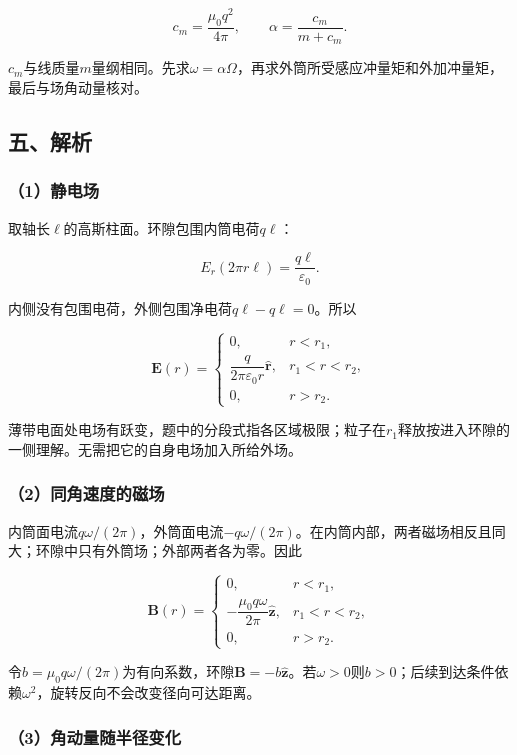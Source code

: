 \documentclass[12pt,a4paper,fontset=fandol]{ctexart}
\begin{document}
\[
c_m=\frac{\mu_0q^2}{4\pi},
\qquad \alpha=\frac{c_m}{m+c_m}.
\]

\(c_m\)与线质量\(m\)量纲相同。先求\(\omega=\alpha\Omega\)，再求外筒所受感应冲量矩和外加冲量矩，最后与场角动量核对。

\subsection{五、解析}\label{ux4e94ux89e3ux6790-5}

\subsubsection{（1）静电场}\label{ux9759ux7535ux573a}

取轴长\(\ell\)的高斯柱面。环隙包围内筒电荷\(q\ell\)：

\[
E_r(2\pi r\ell)=\frac{q\ell}{\varepsilon_0}.
\]

内侧没有包围电荷，外侧包围净电荷\(q\ell-q\ell=0\)。所以

\[
\boxed{
\boldsymbol E(r)=
\begin{cases}
0,&r<r_1,\\
\dfrac{q}{2\pi\varepsilon_0r}\hat{\boldsymbol r},
&r_1<r<r_2,\\
0,&r>r_2.
\end{cases}}
\]

薄带电面处电场有跃变，题中的分段式指各区域极限；粒子在\(r_1\)释放按进入环隙的一侧理解。无需把它的自身电场加入所给外场。

\subsubsection{（2）同角速度的磁场}\label{ux540cux89d2ux901fux5ea6ux7684ux78c1ux573a}

内筒面电流\(q\omega/(2\pi)\)，外筒面电流\(-q\omega/(2\pi)\)。在内筒内部，两者磁场相反且同大；环隙中只有外筒场；外部两者各为零。因此

\[
\boxed{
\boldsymbol B(r)=
\begin{cases}
0,&r<r_1,\\
-\dfrac{\mu_0q\omega}{2\pi}\hat{\boldsymbol z},
&r_1<r<r_2,\\
0,&r>r_2.
\end{cases}}
\]

令\(b=\mu_0q\omega/(2\pi)\)为有向系数，环隙\(\boldsymbol B=-b\hat{\boldsymbol z}\)。若\(\omega>0\)则\(b>0\)；后续到达条件依赖\(\omega^2\)，旋转反向不会改变径向可达距离。

\subsubsection{（3）角动量随半径变化}\label{ux89d2ux52a8ux91cfux968fux534aux5f84ux53d8ux5316}
\end{document}

